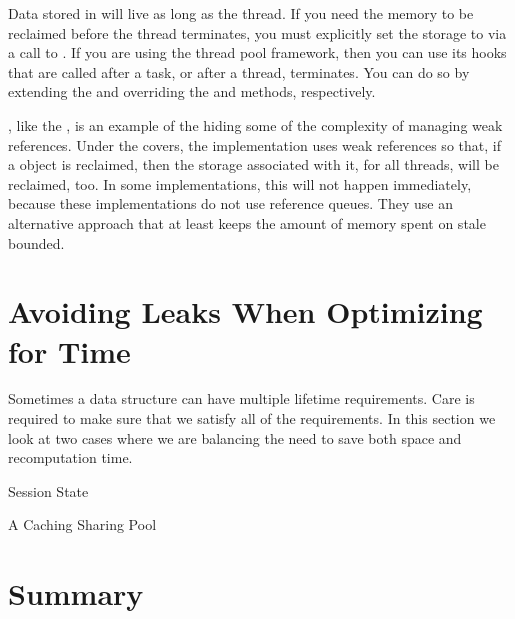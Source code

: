 Data stored in \tls will live as long as the thread. If you need
the memory to be reclaimed before the thread terminates, you must explicitly set
the storage to  via a call to . If you are using
the  thread pool framework, then you can use its
hooks that are called after a task, or after a thread, terminates. You can do so
by extending the  and overriding the
 and  methods, respectively.

\Tls, like the , is an example of the \jre hiding some of the
complexity of managing weak references. Under the covers, the \tls implementation
uses weak references so that, if a  object is reclaimed, then
the storage associated with it, for all threads, will be reclaimed, too. In some
implementations, this will not happen immediately, because these implementations
do not use reference queues. They use an alternative approach that at least
keeps the amount of memory spent on stale \tls bounded.

\section{Avoiding Leaks When Optimizing for Time}
Sometimes a data structure can have multiple lifetime requirements. 
Care is required to make sure that we satisfy all of the requirements.  In this
section we look at two cases where we are balancing the need to save both space and recomputation
time.

\begin{example}{Session State}
\end{example}

\begin{example}{A Caching Sharing Pool}
\end{example}


\section{Summary}






